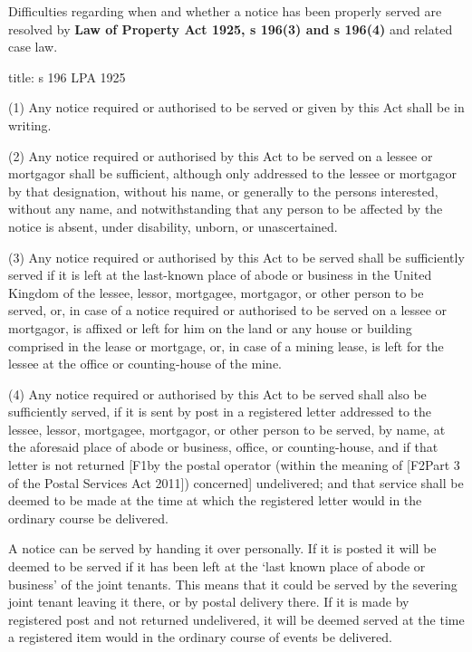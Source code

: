 \documentclass[
]{article}
\newenvironment{Shaded}{}{}
\newcommand{\NormalTok}[1]{#1}
\begin{document}
Difficulties regarding when and whether a notice has been properly
served are resolved by \textbf{Law of Property Act 1925, s 196(3) and s
196(4)} and related case law.

\begin{Shaded}
\begin{Highlighting}[]
\NormalTok{title: s 196 LPA 1925}

\NormalTok{(1) Any notice required or authorised to be served or given by this Act shall be in writing.}

\NormalTok{(2) Any notice required or authorised by this Act to be served on a lessee or mortgagor shall be sufficient, although only addressed to the lessee or mortgagor by that designation, without his name, or generally to the persons interested, without any name, and notwithstanding that any person to be affected by the notice is absent, under disability, unborn, or unascertained.}

\NormalTok{(3) Any notice required or authorised by this Act to be served shall be sufficiently served if it is left at the last{-}known place of abode or business in the United Kingdom of the lessee, lessor, mortgagee, mortgagor, or other person to be served, or, in case of a notice required or authorised to be served on a lessee or mortgagor, is affixed or left for him on the land or any house or building comprised in the lease or mortgage, or, in case of a mining lease, is left for the lessee at the office or counting{-}house of the mine.}

\NormalTok{(4) Any notice required or authorised by this Act to be served shall also be sufficiently served, if it is sent by post in a registered letter addressed to the lessee, lessor, mortgagee, mortgagor, or other person to be served, by name, at the aforesaid place of abode or business, office, or counting{-}house, and if that letter is not returned [F1by the postal operator (within the meaning of [F2Part 3 of the Postal Services Act 2011]) concerned] undelivered; and that service shall be deemed to be made at the time at which the registered letter would in the ordinary course be delivered.}
\end{Highlighting}
\end{Shaded}

A notice can be served by handing it over personally. If it is posted it
will be deemed to be served if it has been left at the `last known place
of abode or business' of the joint tenants. This means that it could be
served by the severing joint tenant leaving it there, or by postal
delivery there. If it is made by registered post and not returned
undelivered, it will be deemed served at the time a registered item
would in the ordinary course of events be delivered.
\end{document}
